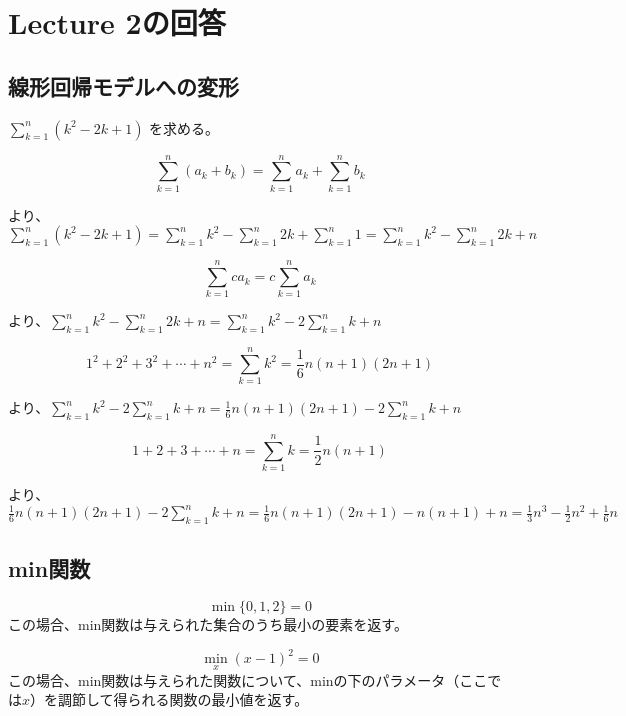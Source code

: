 \section*{Lecture 2の回答}

\subsection*{線形回帰モデルへの変形}

$\sum_{k=1}^n (k^2 - 2k + 1)$ を求める。

\begin{equation*}
	\sum_{k=1}^n (a_k + b_k) = \sum_{k=1}^n a_k + \sum_{k=1}^n b_k
\end{equation*} 

より、$\sum_{k=1}^n (k^2 - 2k + 1) = \sum_{k=1}^n k^2 -  \sum_{k=1}^n 2k +  \sum_{k=1}^n 1 = \sum_{k=1}^n k^2 -  \sum_{k=1}^n 2k +  n $ 

\begin{equation*}
	\sum_{k=1}^n ca_k = c\sum_{k=1}^n a_k
\end{equation*}

より、$ \sum_{k=1}^n k^2 - \sum_{k=1}^n 2k +  n = \sum_{k=1}^n k^2 - 2 \sum_{k=1}^n k + n $ 

\begin{equation*}
1^2 + 2^2 + 3^2 + \cdots + n^2 = \sum_{k=1}^n k^2
 = \frac{1}{6}n(n+1)(2n+1)	
\end{equation*}

より、$ \sum_{k=1}^n k^2 - 2 \sum_{k=1}^n k + n = \frac{1}{6}n(n+1)(2n+1) - 2 \sum_{k=1}^n k + n $

\begin{equation*}
1+2+3+\cdots + n = \sum_{k=1}^n k = \frac{1}{2}n (n+1)	
\end{equation*}

より、$ \frac{1}{6}n(n+1)(2n+1) - 2 \sum_{k=1}^n k + n = \frac{1}{6}n(n+1)(2n+1) - n(n+1) + n = \frac{1}{3}n^3 - \frac{1}{2}n^2 + \frac{1}{6}n $


\subsection*{min関数}
\begin{equation*}
	\min \{ 0, 1, 2 \} = 0
\end{equation*}
この場合、min関数は与えられた集合のうち最小の要素を返す。

\begin{equation*}
	\min_{x} (x-1)^2  = 0
\end{equation*}
この場合、min関数は与えられた関数について、minの下のパラメータ（ここでは$x$）を調節して得られる関数の最小値を返す。

